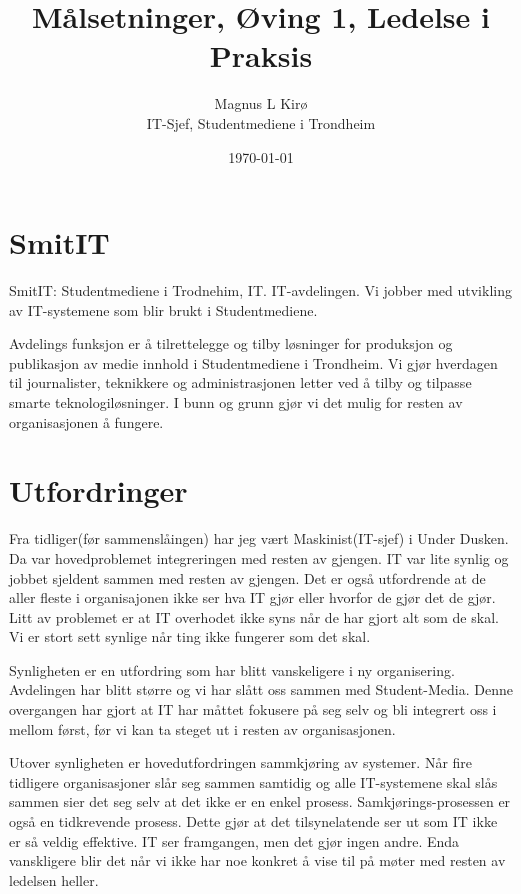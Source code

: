 \documentclass[12pt, a4paper]{article}
\title{
	Målsetninger, Øving 1, Ledelse i Praksis
}
\author{
	Magnus L Kirø \\
	IT-Sjef, Studentmediene i Trondheim 
}
\date{\today}
\begin{document}
\maketitle
{}

\section{SmitIT}

SmitIT: Studentmediene i Trodnehim, IT. IT-avdelingen. Vi jobber med utvikling av IT-systemene som blir brukt i Studentmediene. 

Avdelings funksjon er å tilrettelegge og tilby løsninger for produksjon og publikasjon av medie innhold i Studentmediene i Trondheim. Vi gjør hverdagen til journalister, teknikkere og administrasjonen letter ved å tilby og tilpasse smarte teknologiløsninger. I bunn og grunn gjør vi det mulig for resten av organisasjonen å fungere.  

\section{Utfordringer}
Fra tidliger(før sammenslåingen) har jeg vært Maskinist(IT-sjef) i Under Dusken. Da var hovedproblemet integreringen med resten av gjengen. IT var lite synlig og jobbet sjeldent sammen med resten av gjengen. Det er også utfordrende at de aller fleste i organisajonen ikke ser hva IT gjør eller hvorfor de gjør det de gjør. Litt av problemet er at IT overhodet ikke syns når de har gjort alt som de skal. Vi er stort sett synlige når ting ikke fungerer som det skal. 

Synligheten er en utfordring som har blitt vanskeligere i ny organisering. Avdelingen har blitt større og vi har slått oss sammen med Student-Media. Denne overgangen har gjort at IT har måttet fokusere på seg selv og bli integrert oss i mellom først, før vi kan ta steget ut i resten av organisasjonen. 

Utover synligheten er hovedutfordringen sammkjøring av systemer. Når fire tidligere organisasjoner slår seg sammen samtidig og alle IT-systemene skal slås sammen sier det seg selv at det ikke er en enkel prosess. Samkjørings-prosessen er også en tidkrevende prosess. Dette gjør at det tilsynelatende ser ut som IT ikke er så veldig effektive. IT ser framgangen, men det gjør ingen andre. Enda vanskligere blir det når vi ikke har noe konkret å vise til på møter med resten av ledelsen heller. 
\end{document}

